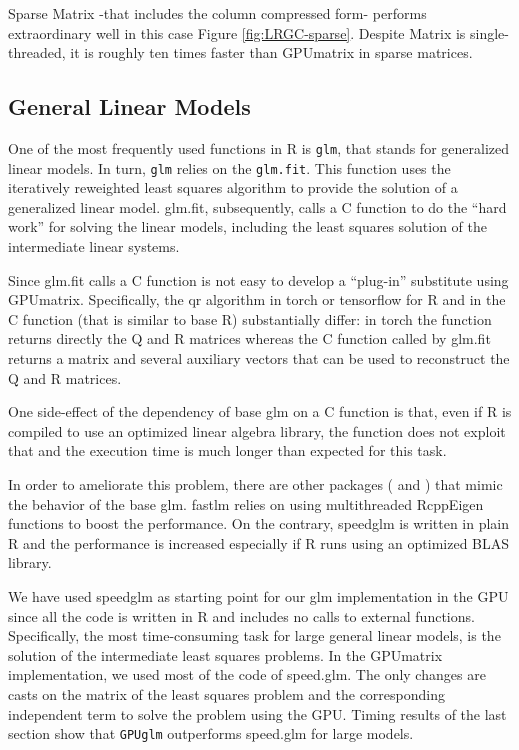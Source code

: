 Sparse Matrix -that includes the column compressed form- performs extraordinary well in this case Figure \ref{fig:LRGC-sparse}. Despite Matrix is single-threaded, it is roughly ten times faster than GPUmatrix in sparse matrices.

\hypertarget{general-linear-models}{%
\subsection{General Linear Models}\label{general-linear-models}}

One of the most frequently used functions in R is \texttt{glm}, that stands for generalized linear models. In turn, \texttt{glm} relies on the \texttt{glm.fit}. This function uses the iteratively reweighted least squares algorithm to provide the solution of a generalized linear model. glm.fit, subsequently, calls a C function to do the ``hard work'' for solving the linear models, including the least squares solution of the intermediate linear systems.

Since glm.fit calls a C function is not easy to develop a ``plug-in'' substitute using GPUmatrix. Specifically, the qr algorithm in torch or tensorflow for R and in the C function (that is similar to base R) substantially differ: in torch the function returns directly the Q and R matrices whereas the C function called by glm.fit returns a matrix and several auxiliary vectors that can be used to reconstruct the Q and R matrices.

One side-effect of the dependency of base glm on a C function is that, even if R is compiled to use an optimized linear algebra library, the function does not exploit that and the execution time is much longer than expected for this task.

In order to ameliorate this problem, there are other packages ( and ) that mimic the behavior of the base glm. fastlm relies on using multithreaded RcppEigen functions to boost the performance. On the contrary, speedglm is written in plain R and the performance is increased especially if R runs using an optimized BLAS library.

We have used speedglm as starting point for our glm implementation in the GPU since all the code is written in R and includes no calls to external functions. Specifically, the most time-consuming task for large general linear models, is the solution of the intermediate least squares problems. In the GPUmatrix implementation, we used most of the code of speed.glm. The only changes are casts on the matrix of the least squares problem and the corresponding independent term to solve the problem using the GPU. Timing results of the last section show that \texttt{GPUglm} outperforms speed.glm for large models.

